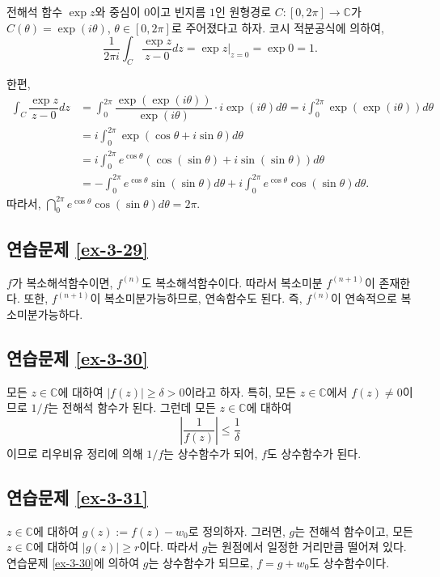 전해석 함수 $\exp z$와 중심이 $0$이고 빈지름 $1$인 원형경로
$C:[0,2\pi] \to \mathbb C$가 $C(\theta) = \exp(i\theta)$, $\theta \in [0,2\pi]$로 
주어졌다고 하자.
코시  적분공식에 의하여,
\[
\dfrac1{2\pi i} \int_C \dfrac{\exp z}{z-0}dz = \exp z\Big|_{z=0} = \exp 0 = 1.
\]

한편,
\begin{align*}
\int_C \dfrac{\exp z}{z-0}dz 
&= \int_0^{2\pi} \dfrac{\exp(\exp(i\theta))}{\exp(i\theta)}\cdot i{\exp(i\theta)}d\theta
= i \int_0^{2\pi}  \exp(\exp(i\theta))d\theta \\
&=i \int_0^{2\pi}   \exp(\cos\theta +i\sin\theta)d\theta\\
&= i \int_0^{2\pi}  e^{\cos\theta} (\cos(\sin\theta) + i\sin(\sin\theta))d\theta\\
&= -  \int_0^{2\pi}   e^{\cos\theta} \sin(\sin\theta)d\theta 
+ i \int_0^{2\pi}     e^{\cos\theta} \cos(\sin\theta)d\theta.
\end{align*}
따라서,
$\dint_0^{2\pi} e^{\cos\theta} \cos(\sin\theta)d\theta = 2\pi$.

\subsection*{연습문제 \ref{ex-3-29}}

$f$가 복소해석함수이면, $f^{(n)}$도 복소해석함수이다.
따라서 복소미분 $f^{(n+1)}$이 존재한다.
또한, $f^{(n+1)}$이 복소미분가능하므로, 연속함수도 된다.
즉, $f^{(n)}$이 연속적으로 복소미분가능하다.

\subsection*{연습문제 \ref{ex-3-30}}

모든 $ z\in \mathbb C$에 대하여
$|f(z)| \ge \delta >0$이라고 하자.
특히, 모든 $z\in\mathbb C$에서 $f(z)\ne0$이므로
$1/f$는 전해석 함수가 된다.
그런데 모든 $z\in\mathbb C$에 대하여
\[
\left| \dfrac1{f(z)}\right| \le \dfrac1\delta
\]
이므로 리우비유 정리에 의해 $1/f$는 상수함수가 되어,
$f$도 상수함수가 된다.

\subsection*{연습문제 \ref{ex-3-31}}

$z\in\mathbb C$에 대하여 $g(z):= f(z) - w_0$로  정의하자.
그러면, $g$는 전해석 함수이고, 모든 $z\in\mathbb C$에 대하여  $|g(z)|\ge r$이다.
따라서 $g$는 원점에서 일정한 거리만큼 떨어져 있다.
연습문제 \ref{ex-3-30}에 의하여 $g$는 상수함수가 되므로,
$f = g +w_0$도 상수함수이다.

